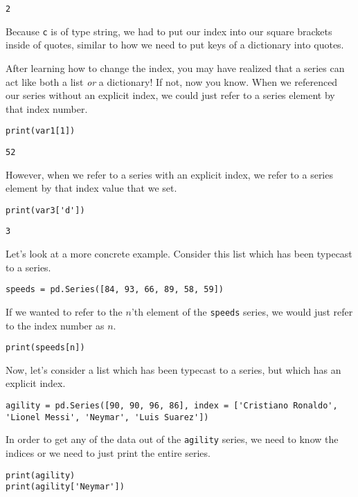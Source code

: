 \begin{lstlisting}
2
\end{lstlisting}
Because \verb|c| is of type string, we had to put our index into our square brackets inside of quotes, similar to how we need to put keys of a dictionary into quotes.\par
After learning how to change the index, you may have realized that a series can act like both a list \textit{or} a dictionary! If not, now you know. When we referenced our series without an explicit index, we could just refer to a series element by that index number.
\begin{lstlisting}[style=pippython]
print(var1[1])
\end{lstlisting}
\begin{lstlisting}
52
\end{lstlisting}
However, when we refer to a series with an explicit index, we refer to a series element by that index value that we set.
\begin{lstlisting}[style=pippython]
print(var3['d'])
\end{lstlisting}
\begin{lstlisting}
3
\end{lstlisting}
Let's look at a more concrete example. Consider this list which has been typecast to a series.
\begin{lstlisting}[style=pippython]
speeds = pd.Series([84, 93, 66, 89, 58, 59])
\end{lstlisting}
If we wanted to refer to the $n$'th element of the \verb|speeds| series, we would just refer to the index number as $n$.
\begin{lstlisting}[style=pippython]
print(speeds[n])
\end{lstlisting}
Now, let's consider a list which has been typecast to a series, but which has an explicit index.
\begin{lstlisting}[style=pippython]
agility = pd.Series([90, 90, 96, 86], index = ['Cristiano Ronaldo', 'Lionel Messi', 'Neymar', 'Luis Suarez'])
\end{lstlisting}
In order to get any of the data out of the \verb|agility| series, we need to know the indices or we need to just print the entire series.
\begin{lstlisting}[style=pippython]
print(agility)
print(agility['Neymar'])
\end{lstlisting}
